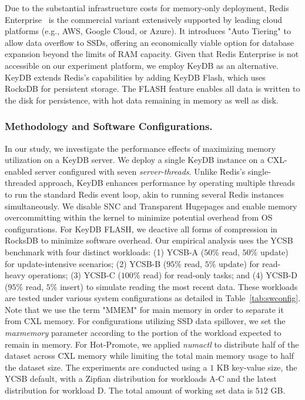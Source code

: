 Due to the substantial infrastructure costs for memory-only deployment, Redis Enterprise~\cite{redisenterprise} is the commercial variant extensively supported by leading cloud platforms (e.g., AWS, Google Cloud, or Azure). It introduces "Auto Tiering"\cite{redisautotiering} to allow data overflow to SSDs, offering an economically viable option for database expansion beyond the limits of RAM capacity. Given that Redis Enterprise is not accessible on our experiment platform, we employ KeyDB as an alternative. KeyDB extends Redis's capabilities by adding KeyDB Flash, which uses RocksDB for persistent storage. The FLASH feature enables all data is written to the disk for persistence, with hot data remaining in memory as well as disk.

\subsubsection{Methodology and Software Configurations.}

In our study, we investigate the performance effects of maximizing memory utilization on a KeyDB server. We deploy a single KeyDB instance on a CXL-enabled server configured with seven \textit{server-threads}. Unlike Redis's single-threaded approach, KeyDB enhances performance by operating multiple threads to run the standard Redis event loop, akin to running several Redis instances simultaneously. We disable SNC and Transparent Hugepages and enable memory overcommitting within the kernel to minimize potential overhead from OS configurations. For KeyDB FLASH, we deactive all forms of compression in RocksDB to minimize software overhead. Our empirical analysis uses the YCSB benchmark with four distinct workloads: (1) YCSB-A ($50\%$ read, $50\%$ update) for update-intensive scenarios; (2) YCSB-B ($95\%$ read, $5\%$ update) for read-heavy operations; (3) YCSB-C ($100\%$ read) for read-only tasks; and (4) YCSB-D ($95\%$ read, $5\%$ insert) to simulate reading the most recent data. These workloads are tested under various system configurations as detailed in Table~\ref{tab:swconfig}. Note that we use the term "MMEM" for main memory in order to separate it from CXL memory. For configurations utilizing SSD data spillover, we set the \textit{maxmemory} parameter according to the portion of the workload expected to remain in memory. For Hot-Promote, we applied \textit{numactl} to distribute half of the dataset across CXL memory while limiting the total main memory usage to half the dataset size. The experiments are conducted using a $1$ KB key-value size, the YCSB default, with a Zipfian distribution for workloads A-C and the latest distribution for workload D. The total amount of working set data is $512$ GB.

